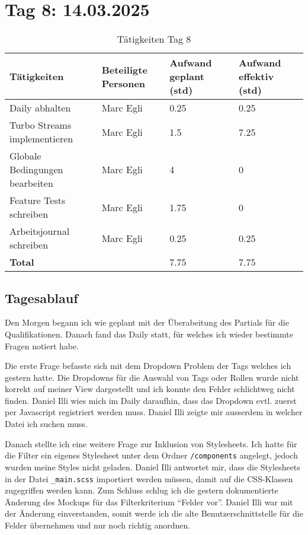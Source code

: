 \section{Tag 8: 14.03.2025}
\begin{table}[H]
    \begin{tabular}{|L{0.4\textwidth}|C{60pt}|C{60pt}|C{60pt}|}
        \hline
        \color{white}Tätigkeiten & \color{white}Beteiligte \color{white}Personen & \color{white}Aufwand geplant (std) & \color{white}Aufwand effektiv (std) \\
        \hline
        Daily abhalten & Marc Egli & 0.25 & 0.25 \\
        \hline
        Turbo Streams implementieren & Marc Egli & 1.5 & 7.25 \\
        \hline
        Globale Bedingungen bearbeiten & Marc Egli & 4 & 0 \\
        \hline
        Feature Tests schreiben & Marc Egli & 1.75 & 0 \\
        \hline
        Arbeitsjournal schreiben & Marc Egli & 0.25 & 0.25 \\
        \textbf{Total} &  & 7.75 & 7.75 \\
        \hline
    \end{tabular}
    \caption{Tätigkeiten Tag 8}
\end{table}

\subsection*{Tagesablauf}
Den Morgen begann ich wie geplant mit der Überabeitung des Partials für die Qualifikationen. Danach fand das Daily statt, für welches ich wieder
bestimmte Fragen notiert habe.

Die erste Frage befasste sich mit dem Dropdown Problem der Tags welches ich gestern hatte. Die Dropdowns für die Auswahl von Tags oder Rollen wurde nicht korrekt
auf meiner View dargestellt und ich konnte den Fehler schlichtweg nicht finden. Daniel Illi wies mich im Daily daraufhin, dass
das Dropdown evtl. zuerst per Javascript registriert werden muss. Daniel Illi zeigte mir ausserdem in welcher Datei ich suchen muss.

Danach stellte ich eine weitere Frage zur Inklusion von Stylesheets. Ich hatte für die Filter ein eigenes Stylesheet unter dem Ordner \texttt{/components}
angelegt, jedoch wurden meine Styles nicht geladen. Daniel Illi antwortet mir, dass die Stylesheets in der Datei \texttt{\_main.scss} importiert werden müssen,
damit auf die CSS-Klassen zugegriffen werden kann. Zum Schluss schlug ich die gestern dokumentierte Änderung des Mockups für das Filterkriterium ``Felder vor''.
Daniel Illi war mit der Änderung einverstanden, somit werde ich die alte Benutzerschnittstelle für die Felder übernehmen und nur noch richtig anordnen.

